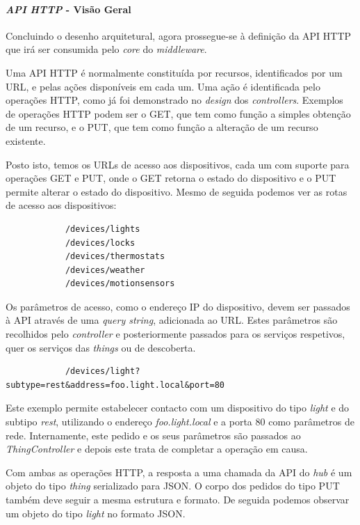 %
%
%
%

\paragraph*{\textit{API HTTP} - Visão Geral}

Concluindo o desenho arquitetural, agora prossegue-se à definição da API HTTP que irá ser consumida pelo \textit{core} do \textit{middleware}.

Uma API HTTP é normalmente constituída por recursos, identificados por um URL, e pelas ações disponíveis em cada um. Uma ação é identificada pelo operações HTTP, como já foi demonstrado no \textit{design} dos \textit{controllers}. Exemplos de operações HTTP podem ser o GET, que tem como função a simples obtenção de um recurso, e o PUT, que tem como função a alteração de um recurso existente.

Posto isto, temos os URLs de acesso aos dispositivos, cada um com suporte para operações GET e PUT, onde o GET retorna o estado do dispositivo e o PUT permite alterar o estado do dispositivo. Mesmo de seguida podemos ver as rotas de acesso aos dispositivos:

\begin{verbatim}
            /devices/lights
            /devices/locks
            /devices/thermostats
            /devices/weather
            /devices/motionsensors
\end{verbatim}

Os parâmetros de acesso, como o endereço IP do dispositivo, devem ser passados à API através de uma \textit{query string}, adicionada ao URL. Estes parâmetros são recolhidos pelo \textit{controller} e posteriormente passados para os serviços respetivos, quer os serviços das \textit{things} ou de descoberta.

\begin{verbatim}
            /devices/light?subtype=rest&address=foo.light.local&port=80
\end{verbatim}

Este exemplo permite estabelecer contacto com um dispositivo do tipo \textit{light} e do subtipo \textit{rest}, utilizando o endereço \textit{foo.light.local} e a porta 80 como parâmetros de rede. Internamente, este pedido e os seus parâmetros são passados ao \textit{ThingController} e depois este trata de completar a operação em causa.

Com ambas as operações HTTP, a resposta a uma chamada da API do \textit{hub} é um objeto do tipo \textit{thing} serializado para JSON. O corpo dos pedidos do tipo PUT também deve seguir a mesma estrutura e formato. De seguida podemos observar um objeto do tipo \textit{light} no formato JSON.


